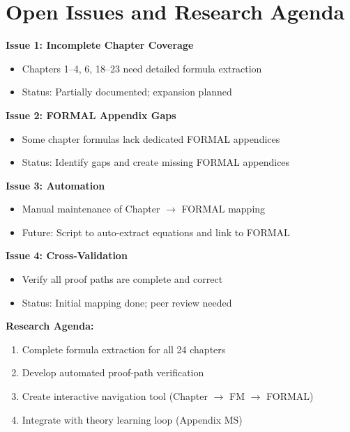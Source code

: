 \section{Open Issues and Research Agenda}
\label{sec:fm-open-issues}

\begin{tcolorbox}[colback=red!5!white, colframe=red!75!black,
    title=\textbf{Open Issues}]

\textbf{Issue 1: Incomplete Chapter Coverage}
\begin{itemize}[nosep]
    \item Chapters 1--4, 6, 18--23 need detailed formula extraction
    \item Status: Partially documented; expansion planned
\end{itemize}

\textbf{Issue 2: FORMAL Appendix Gaps}
\begin{itemize}[nosep]
    \item Some chapter formulas lack dedicated FORMAL appendices
    \item Status: Identify gaps and create missing FORMAL appendices
\end{itemize}

\textbf{Issue 3: Automation}
\begin{itemize}[nosep]
    \item Manual maintenance of Chapter $\rightarrow$ FORMAL mapping
    \item Future: Script to auto-extract equations and link to FORMAL
\end{itemize}

\textbf{Issue 4: Cross-Validation}
\begin{itemize}[nosep]
    \item Verify all proof paths are complete and correct
    \item Status: Initial mapping done; peer review needed
\end{itemize}

\end{tcolorbox}

\textbf{Research Agenda:}
\begin{enumerate}[nosep]
    \item Complete formula extraction for all 24 chapters
    \item Develop automated proof-path verification
    \item Create interactive navigation tool (Chapter $\rightarrow$ FM $\rightarrow$ FORMAL)
    \item Integrate with theory learning loop (Appendix MS)
\end{enumerate}

